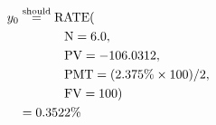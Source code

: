 \begin{align*}
y_{0}&\overset{\text{should}}{=}\text{RATE}(\\
	&\hspace{.5in}\text{N}=6.0,\\
	&\hspace{.5in}\text{PV}=-106.0312,\\
	&\hspace{.5in}\text{PMT}=(2.375\%\times 100)/2,\\
	&\hspace{.5in}\text{FV}=100)\\
	&=0.3522\%
\end{align*}
